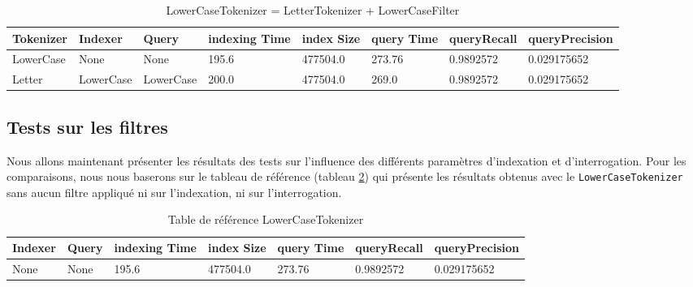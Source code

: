 \begin{table}[!htbp]
    \hspace{-2.5cm}
                \begin{tabular}{|p{2cm}|p{2cm}|p{2cm}|p{2cm}|p{2cm}|p{2cm}|p{2cm}|p{2.5cm}|}
                    \hline
                    \textbf{Tokenizer} & \textbf{Indexer} & \textbf{Query} & \textbf{indexing Time} & \textbf{index Size} & \textbf{query Time} & \textbf{queryRecall} & \textbf{queryPrecision}\\
                    \hline
LowerCase & None & None & 195.6 & 477504.0 & 273.76 & 0.9892572 & 0.029175652\\
		\hline
Letter & LowerCase & LowerCase & 200.0 & 477504.0 & 269.0 & 0.9892572 & 0.029175652\\
                    \hline
                \end{tabular}
                \caption{LowerCaseTokenizer = LetterTokenizer + LowerCaseFilter}
                \label{tab:tests_tokenizers_2}
            \end{table}

\subsection{Tests sur les filtres}
\label{section:filtrestest}

Nous allons maintenant présenter les résultats des tests sur l’influence des différents paramètres d’indexation et d’interrogation. Pour les comparaisons, nous nous baserons sur le tableau de référence (tableau \ref{tab:references}) qui présente les résultats obtenus avec le \texttt{LowerCaseTokenizer} sans aucun filtre appliqué ni sur l’indexation, ni sur l’interrogation.

\begin{table}[!htbp]
    \hspace{-2cm}
                \begin{tabular}{|p{2cm}|p{2cm}|p{2cm}|p{2cm}|p{2.5cm}|p{2.5cm}|p{2.5cm}|}
                    \hline
                    \textbf{Indexer} & \textbf{Query} & \textbf{indexing Time} & \textbf{index Size} & \textbf{query Time} & \textbf{queryRecall} & \textbf{queryPrecision}\\
                    \hline
None & None & 195.6 & 477504.0 & 273.76 & 0.9892572 & 0.029175652\\
                    \hline
                \end{tabular}
                \caption{Table de référence LowerCaseTokenizer}
                \label{tab:references}
            \end{table}


